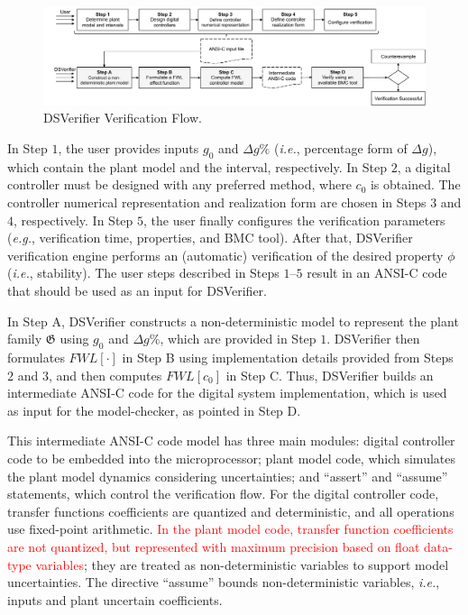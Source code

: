 \documentclass{sig-alternate-05-2015}
\begin{document}
\begin{figure}[t]
\centering
\includegraphics[width=\textwidth]{figures/verification-flow.pdf}
\caption{DSVerifier Verification Flow.}
\label{DSVerifier_process}
\end{figure}

In Step $1$, the user provides inputs $g_0$ and $\Delta{g}\%$ ({\it i.e.},
percentage form of $\Delta{g}$), which contain the plant model and the
interval, respectively.  In Step $2$, a digital controller must be designed
with any preferred method, where $c_0$ is obtained.  The controller
numerical representation and realization form are chosen in Steps $3$ and
$4$, respectively.  In Step $5$, the user finally configures the
verification parameters ({\it e.g.}, verification time, properties, and BMC
tool).  After that, DSVerifier verification engine performs an (automatic)
verification of the desired property $\phi$ ({\it i.e.}, stability).  The
user steps described in Steps $1$--$5$ result in an ANSI-C code that should
be used as an input for DSVerifier.

In Step A, DSVerifier constructs a non-deterministic model to represent the
plant family $\mathfrak{G}$ using $g_0$ and $\Delta{g}\%$, which are
provided in Step $1$.  DSVerifier then formulates $\mathit{FWL}[\cdot]$ in
Step B using implementation details provided from Steps $2$ and $3$, and
then computes $\mathit{FWL}[c_0]$ in Step C.  Thus, DSVerifier builds an
intermediate ANSI-C code for the digital system implementation, which is
used as input for the model-checker, as pointed in Step D.

This intermediate ANSI-C code model has three main modules: digital
controller code to be embedded into the microprocessor; plant model code,
which simulates the plant model dynamics considering uncertainties; and
``assert'' and ``assume'' statements, which control the verification flow. 
For the digital controller code, transfer functions coefficients are
quantized and deterministic, and all operations use fixed-point arithmetic. 
\textcolor{red}{In the plant model code, transfer function coefficients are
not quantized, but represented with maximum precision based on float
data-type variables}; they are treated as non-deterministic variables to
support model uncertainties.  The directive ``assume'' bounds
non-deterministic variables, {\it i.e.}, inputs and plant uncertain
coefficients.
\end{document}
